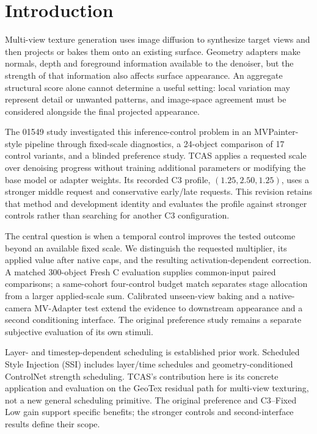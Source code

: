 \documentclass[times,twocolumn,final]{elsarticle}
\begin{document}
\section{Introduction}
\label{sec:intro}

Multi-view texture generation uses image diffusion to synthesize target views and then projects or bakes them onto an existing surface. Geometry adapters make normals, depth and foreground information available to the denoiser, but the strength of that information also affects surface appearance. An aggregate structural score alone cannot determine a useful setting: local variation may represent detail or unwanted patterns, and image-space agreement must be considered alongside the final projected appearance.

The 01549 study investigated this inference-control problem in an MVPainter-style pipeline through fixed-scale diagnostics, a 24-object comparison of 17 control variants, and a blinded preference study. TCAS applies a requested scale over denoising progress without training additional parameters or modifying the base model or adapter weights. Its recorded C3 profile, $(1.25,2.50,1.25)$, uses a stronger middle request and conservative early/late requests. This revision retains that method and development identity and evaluates the profile against stronger controls rather than searching for another C3 configuration.

The central question is when a temporal control improves the tested outcome beyond an available fixed scale. We distinguish the requested multiplier, its applied value after native caps, and the resulting activation-dependent correction. A matched 300-object Fresh C evaluation supplies common-input paired comparisons; a same-cohort four-control budget match separates stage allocation from a larger applied-scale sum. Calibrated unseen-view baking and a native-camera MV-Adapter test extend the evidence to downstream appearance and a second conditioning interface. The original preference study remains a separate subjective evaluation of its own stimuli.

Layer- and timestep-dependent scheduling is established prior work. Scheduled Style Injection (SSI) includes layer/time schedules and geometry-conditioned ControlNet strength scheduling. TCAS's contribution here is its concrete application and evaluation on the GeoTex residual path for multi-view texturing, not a new general scheduling primitive. The original preference and C3--Fixed Low gain support specific benefits; the stronger controls and second-interface results define their scope.
\end{document}
